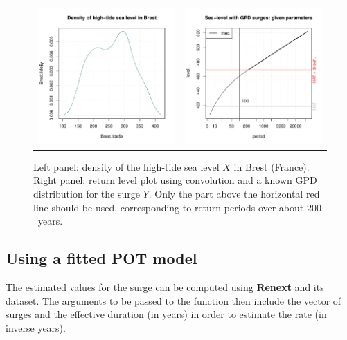 \documentclass[11pt,a4paper]{report}\usepackage[]{graphicx}\usepackage[]{color}
\begin{document}
\begin{figure}
   \centering
   \begin{tabular}{c c} 
     \includegraphics[width=7.4cm]{Rgraphics/figBrestTide-1.pdf} &
     \includegraphics[width=7.4cm]{Rgraphics/figBrestConv0-1.pdf} 
   \end{tabular}
   \caption{\label{BrestTide}Left panel:  density of the high-tide 
   sea level $X$ in Brest (France). Right panel: return level plot 
   using convolution and a known GPD distribution for the surge $Y$. 
   Only the part above the horizontal red line should be used, 
   corresponding to return periods over about $200$~years. 
 }
\end{figure}

\subsection{Using a fitted POT model}
The estimated values for the surge can be computed using
\textbf{Renext} and its \verb@Brest@ dataset.  The arguments to be
passed to the \verb@Renouv@ function then include the vector of surges
\verb@x@ and the effective duration (in years) in order to estimate
the rate \verb@lambda@ (in inverse years).
\end{document}
